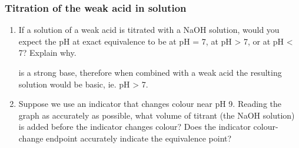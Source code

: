 		\subsubsection{Titration of the weak acid in solution}

			\begin{enumerate}
				\item If a solution of a weak acid is titrated with a NaOH solution, would you expect the pH at exact equivalence to be at pH = 7, at pH > 7, or at pH < 7? Explain why.
					
					 is a strong base, therefore when combined with a weak acid the resulting solution would be basic, ie. pH > 7.

				\item Suppose we use an indicator that changes colour near pH 9. Reading the graph as accurately as possible, what volume of titrant (the NaOH solution) is added before the indicator changes colour? Does the indicator colour-change endpoint accurately indicate the equivalence point?
			\end{enumerate}

